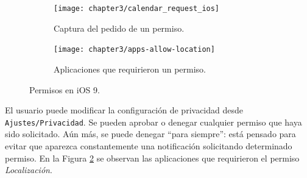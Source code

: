 \begin{figure}[hbtp]
	\centering
	\begin{subfigure}{.33\linewidth}
    	\texttt{[image: chapter3/calendar\_request\_ios]}
	    \caption{Captura del pedido de un permiso.}    		
	    \label{fig:chapter03:iospermCapture}
    \end{subfigure}
    \begin{subfigure}{.33\linewidth}
    	\texttt{[image: chapter3/apps-allow-location]}
	    \caption{Aplicaciones que requirieron un permiso.}    		
	    \label{fig:chapter03:privacy}
	\end{subfigure}
	\caption{Permisos en iOS 9.}    		
	\label{fig:chapter03:app-permissions-ios}
\end{figure}
\newpage
El usuario puede modificar la configuración de privacidad desde \texttt{Ajustes/Privacidad}. Se pueden aprobar o denegar cualquier permiso que haya sido solicitado. Aún más, se puede denegar ``para siempre'': está pensado para evitar que aparezca constantemente una notificación solicitando determinado permiso. En la Figura \ref{fig:chapter03:privacy} se observan las aplicaciones que requirieron el permiso \emph{Localización}.\\

